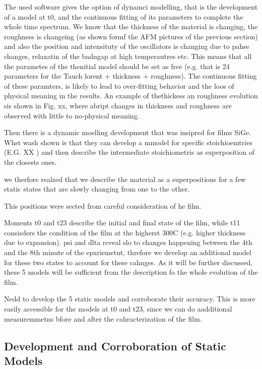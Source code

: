 The used software gives the option of dynamci modelling, that is the development of a model at t0, and the continuous fitting of its parameters to complete the whole time spectrum. We know that the thickness of the material is changing, the roughness is changeing (as shown formf the AFM pictures of the previous section) and also the position and intensituty of the oscillators is changing due to pahse changes, relaxatin of the badngap at high temperautres etc. This means that all the parametes of the thenitial model should be set as free (e.g. that is 24 parameters for the Tauch lorent + thickness + roughness). The continuous fitting of these paramters, is likely to lead to over-fitting behavior and the loos of physical meaning in the results. An example of thethickess an roughness evolution sis shown in Fig. xx, where abript changes in thickness and roughness are observed with little to no-physical meaning. 

Then there is a dynamic moelling development that was insipred for films SiGe. Whst wash shown is that they can develop a mmodel for specific stoichioemtries (E.G. XX ) and then describe the intermediate stoichiometris as superposition of the closests ones. 

we therfore realzed that we describe the material as a superpositions for a few static states that are slowly changing from one to the other. 

This positions were sected from careful consideration of he film. 

Moments t0 and t23 describe the initial and final state of the film, while t11 consisders the condition of the film at the higherst 300C (e.g. higher thickness due to expansion). psi and dlta reveal slo to changes happening between the 4th and the 8th minute of the epxriemetnt, threfore we develop an additional model for these two states to account for these cahnges. As it will be further discussed, these 5 models will be sufficient from the description fo the whole evolution of the film. 

Nedd to develop the 5 static models and corroborate their accuracy. 
This is more easily accessible for the models at t0 and t23, since we can do aadditional measuremmetns bfore and after the cahracterization of the film. 

\subsection{Development and Corroboration of Static Models}

